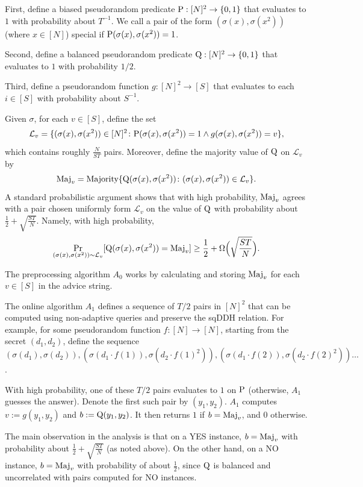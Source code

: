 \documentclass[11pt]{article}
\begin{document}
First, define a biased pseudorandom predicate 
$\textup{P}:[N]^2 \to \{0,1\}$
that evaluates to $1$ with probability about $T^{-1}$.
We call a pair of the form
$(\sigma(x),\sigma(x^2))$ (where $x \in [N]$) special if
$\textup{P}(\sigma(x),\sigma(x^2)) = 1$.

Second, define a balanced pseudorandom predicate  $\textup{Q}:[N]^2 \to \{0,1\}$
that evaluates to $1$ with probability $1/2$.

Third, define a pseudorandom function 
$g:[N]^2 \to [S]$ that evaluates to each $i \in [S]$ with probability about $S^{-1}$.

Given $\sigma$, for each $v \in [S]$, define the set 
$$\mathcal{L}_v = \{(\sigma(x),\sigma(x^2)) \in [N]^2 \colon \textup{P}(\sigma(x),\sigma(x^2)) = 1 \wedge g(\sigma(x),\sigma(x^2)) = v\},$$
which contains roughly $\frac{N}{ST}$ pairs.
Moreover, define the majority value of 
$\textup{Q}$ on $\mathcal{L}_v$ by 
$$\textup{Maj}_v = 
\textup{Majority}\{\textup{Q}(\sigma(x),\sigma(x^2)) \colon (\sigma(x),\sigma(x^2)) \in \mathcal{L}_v\}.$$
A standard probabilistic argument shows that with high probability, $\textup{Maj}_v$ agrees with a pair chosen uniformly form $\mathcal{L}_v$ on the value of $\textup{Q}$  with probability about $\frac{1}{2} + \sqrt{\frac{ST}{N}}$.
Namely, with high probability,
$$
\Pr_{(\sigma(x),\sigma(x^2)) \sim \mathcal{L}_v}[\textup{Q}(\sigma(x),\sigma(x^2)) = \textup{Maj}_v] \geq \frac{1}{2} + \Omega \Bigl(\sqrt{\frac{ST}{N}} \Bigr).
$$

The preprocessing algorithm $A_0$ works by 
calculating and storing 
$\textup{Maj}_v$ for each $v \in [S]$ in the advice string.

The online algorithm $A_1$ defines a sequence of $T/2$ pairs in $[N]^2$ that can be computed using non-adaptive queries and preserve the sqDDH relation. For example, 
for some pseudorandom function $f: [N] \rightarrow [N]$, starting from the secret $(d_1,d_2)$, define the sequence $(\sigma(d_1),\sigma(d_2)),(\sigma(d_1 \cdot f(1)),\sigma(d_2 \cdot f(1)^2)),(\sigma(d_1 \cdot f(2)),\sigma(d_2 \cdot f(2)^2)) \ldots$.

With high probability, one of these $T/2$ pairs evaluates to $1$ on $\textup{P}$ (otherwise, $A_1$ guesses the answer).
Denote the first such pair by
$(y_1,y_2)$. 
$A_1$ computes 
$v:= g(y_1,y_2)$ and 
$b := \textup{Q}(y_1,y_2)$.
It then returns $1$ if 
$b = \textup{Maj}_v$,
and $0$ otherwise. 

The main observation in the analysis is
that on a YES instance, 
$b = \textup{Maj}_v$ with probability about 
$\frac{1}{2} + \sqrt{\frac{ST}{N}}$ (as noted above). On the other hand, on a NO instance, $b = \textup{Maj}_v$ with probability of about $\frac{1}{2}$, since 
$\textup{Q}$ is balanced and uncorrelated with pairs computed for NO instances.
\end{document}
